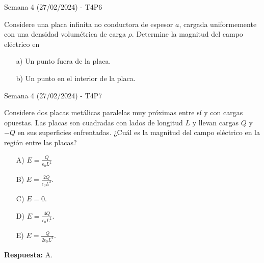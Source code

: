 \begin{frame}{Semana 4 (27/02/2024) - T4P6}
    
    Considere una placa infinita no conductora de espesor $a$, cargada uniformemente con una densidad volum\'etrica de carga $\rho$. Determine la magnitud del campo el\'ectrico en
    
    \begin{itemize}
        \item[a)] Un punto fuera de la placa.
        \item[b)] Un punto en el interior de la placa.
    \end{itemize}
    
\end{frame}

\begin{frame}{Semana 4 (27/02/2024) - T4P7}
    
    Considere dos placas metálicas paralelas muy próximas entre sí y con cargas opuestas. Las placas son cuadradas con lados de longitud $L$ y llevan cargas $Q$ y $-Q$ en sus superficies enfrentadas. ¿Cuál es la magnitud del campo eléctrico en la región entre las placas?
    
    \begin{itemize}
        \item[A)] $E = \frac{Q}{\epsilon_0L^2}$
        \item[B)] $E = \frac{2Q}{\epsilon_0L^2}$.
        \item[C)] $E=0$.
        \item[D)] $E = \frac{4Q}{\epsilon_0L^2}$.
        \item[E)] $E = \frac{Q}{2\epsilon_0L^2}$.
    \end{itemize}
    
    \pause\bigskip\centering\textbf{Respuesta:} A.
    
\end{frame}

